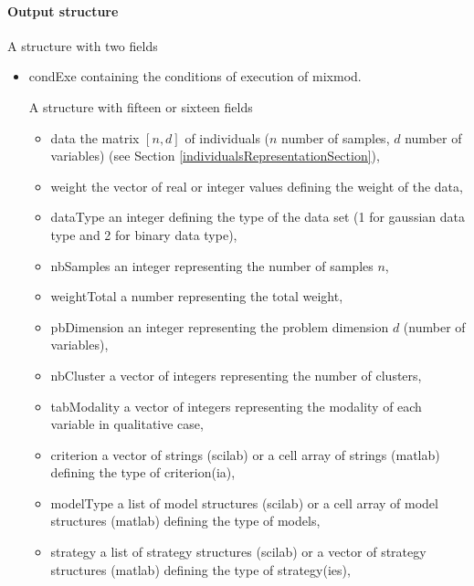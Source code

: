 \paragraph{Output structure}
A structure with two fields
\begin{itemize}
  \item condExe containing the conditions of execution of {\sc mixmod}.

A structure with fifteen or sixteen fields
\begin{itemize}
  \item data the matrix $[n,d]$ of individuals ($n$ number of samples, $d$ number of variables) (see Section \ref{individualsRepresentationSection}),
	\item weight the vector of real or integer values defining the weight of the data,
	\item dataType an integer defining the type of the data set
                         (1 for gaussian data type and 2 for binary data type),
  \item nbSamples an integer representing the number of samples $n$,
  \item weightTotal a number representing the total weight,
  \item pbDimension an integer representing the problem dimension $d$ (number of variables),
   \item nbCluster a vector of integers representing the number of clusters,
  \item tabModality a vector of integers representing the modality of each variable in qualitative case,
  \item criterion a vector of strings (scilab) or a cell array of strings (matlab) defining the type of criterion(ia),
  \item modelType a list of model structures (scilab) or a cell array of model structures (matlab) defining the type
        of models,
  \item strategy a list of strategy structures (scilab) or a vector of strategy structures (matlab) defining the type of strategy(ies),

\end{itemize}
\end{itemize}
